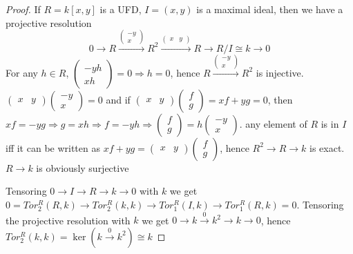 \documentclass{article}
\theoremstyle{definition}
\theoremstyle{remark}
\theoremstyle{definition}
\begin{document}
\begin{proof}
If $R=k[x,y]$ is a UFD, $I=(x,y)$ is a maximal ideal, then we have a projective resolution
\[0\to R\xrightarrow{\begin{pmatrix}
-y\\
x
\end{pmatrix}}R^2\xrightarrow{\begin{pmatrix}
x&y
\end{pmatrix}}R\to R/I\cong k\to0\]
For any $h\in R$, $\begin{pmatrix}
-yh \\
xh
\end{pmatrix}=0\Rightarrow h=0$, hence $R\xrightarrow{\begin{pmatrix}
-y\\
x
\end{pmatrix}}R^2$ is injective. $\begin{pmatrix}
x&y
\end{pmatrix}\begin{pmatrix}
-y\\
x
\end{pmatrix}=0$ and if $\begin{pmatrix}
x&y
\end{pmatrix}\begin{pmatrix}
f\\
g
\end{pmatrix}=xf+yg=0$, then $xf=-yg\Rightarrow g=xh\Rightarrow f=-yh\Rightarrow\begin{pmatrix}
f \\
g
\end{pmatrix}=h\begin{pmatrix}
-y \\
x
\end{pmatrix}$. any element of $R$ is in $I$ iff it can be written as $xf+yg=\begin{pmatrix}
x&y
\end{pmatrix}\begin{pmatrix}
f\\
g
\end{pmatrix}$, hence $R^2\to R\to k$ is exact. $R\to k$ is obviously surjective \par
Tensoring $0\to I\to R\to k\to0$ with $k$ we get $0=Tor^R_2(R,k)\to Tor^R_2(k,k)\to Tor^R_1(I,k)\to Tor^R_1(R,k)=0$. Tensoring the projective resolution with $k$ we get $0\to k\xrightarrow{0}k^2\to k\to0$, hence $Tor^R_2(k,k)=\ker(k\xrightarrow{0}k^2)\cong k$
\end{proof}
\end{document}
